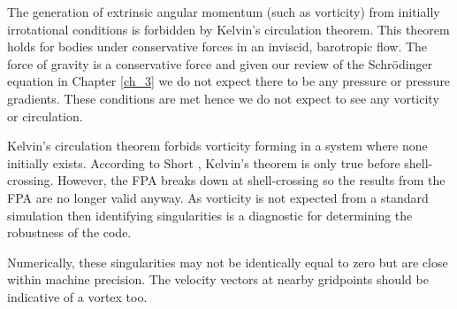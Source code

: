 The generation of extrinsic angular momentum (such as vorticity) from initially irrotational conditions is forbidden by Kelvin's circulation theorem. This theorem holds for bodies under conservative forces in an inviscid, barotropic flow. The force of gravity is a conservative force and given our review of the Schr\"odinger equation in Chapter \ref{ch_3} we do not expect there to be any pressure or pressure gradients. These conditions are met hence we do not expect to see any vorticity or circulation.

Kelvin's circulation theorem forbids vorticity forming in a system where none initially exists. According to Short \citep{bib_short}, Kelvin's theorem is only true before shell-crossing. However, the FPA breaks down at shell-crossing so the results from the FPA are no longer valid anyway. As vorticity is not expected from a standard simulation then identifying singularities is a diagnostic for determining the robustness of the code.

Numerically, these singularities may not be identically equal to zero but are close within machine precision. The velocity vectors at nearby gridpoints should be indicative of a vortex too.


